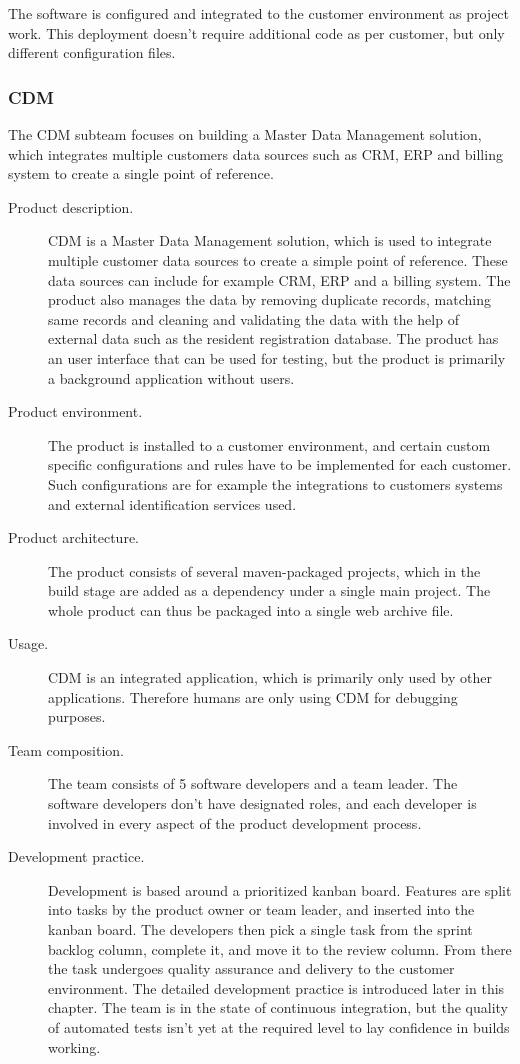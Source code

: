 \documentclass[english, grading]{tktltiki2}
\theoremstyle{definition}
\theoremstyle{remark}
\begin{document}
The software is configured and integrated to the customer environment as project work. This deployment doesn't require additional code as per customer, but only different configuration files. 

\subsubsection{CDM} 
The CDM subteam focuses on building a Master Data Management \cite{loshin2010master} solution, which integrates multiple customers data sources such as CRM, ERP and billing system to create a single point of reference. 

\begin{description}
  \item[Product description.] CDM is a Master Data Management \cite{loshin2010master} solution, which is used to integrate multiple customer data sources to create a simple point of reference. These data sources can include for example CRM, ERP and a billing system. The product also manages the data by removing duplicate records, matching same records and cleaning and validating the data with the help of external data such as the resident registration database. The product has an user interface that can be used for testing, but the product is primarily a background application without users. 
  \item[Product environment.] The product is installed to a customer environment, and certain custom specific configurations and rules have to be implemented for each customer. Such configurations are for example the integrations to customers systems and external identification services used. 
  \item[Product architecture.] The product consists of several maven-packaged projects, which in the build stage are added as a dependency under a single main project. The whole product can thus be packaged into a single web archive file.
  \item[Usage.] CDM is an integrated application, which is primarily only used by other applications. Therefore humans are only using CDM for debugging purposes.
  \item[Team composition.] The team consists of 5 software developers and a team leader. The software developers don't have designated roles, and each developer is involved in every aspect of the product development process.
  \item[Development practice.] Development is based around a prioritized kanban board. Features are split into tasks by the product owner or team leader, and inserted into the kanban board. The developers then pick a single task from the sprint backlog column, complete it, and move it to the review column. From there the task undergoes quality assurance and delivery to the customer environment. The detailed development practice is introduced later in this chapter. The team is in the state of continuous integration, but the quality of automated tests isn't yet at the required level to lay confidence in builds working. 

\end{description}
\end{document}
